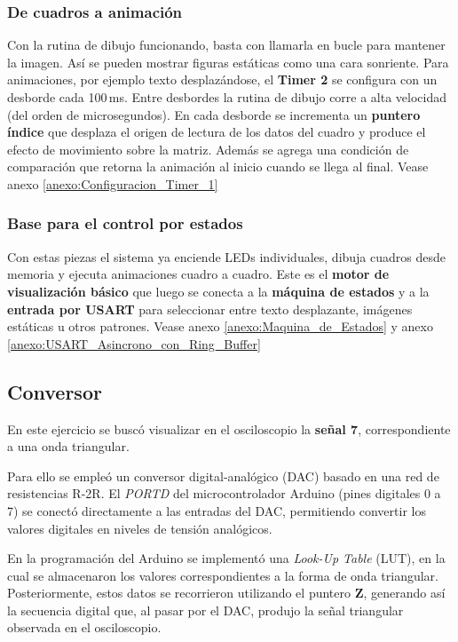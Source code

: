 \subsubsection{De cuadros a animación}
Con la rutina de dibujo funcionando, basta con llamarla en bucle para mantener la imagen. Así se pueden mostrar figuras estáticas como una cara sonriente. Para animaciones, por ejemplo texto desplazándose, el \textbf{Timer 2} se configura con un desborde cada 100\,ms. Entre desbordes la rutina de dibujo corre a alta velocidad (del orden de microsegundos). En cada desborde se incrementa un \textbf{puntero índice} que desplaza el origen de lectura de los datos del cuadro y produce el efecto de movimiento sobre la matriz. Además se agrega una condición de comparación que retorna la animación al inicio cuando se llega al final. Vease anexo \ref{anexo:Configuracion_Timer_1}


\subsubsection{Base para el control por estados}
Con estas piezas el sistema ya enciende LEDs individuales, dibuja cuadros desde memoria y ejecuta animaciones cuadro a cuadro. Este es el \textbf{motor de visualización básico} que luego se conecta a la \textbf{máquina de estados} y a la \textbf{entrada por USART} para seleccionar entre texto desplazante, imágenes estáticas u otros patrones. Vease anexo \ref{anexo:Maquina_de_Estados} y anexo \ref{anexo:USART_Asincrono_con_Ring_Buffer}


\subsection{Conversor}
En este ejercicio se buscó visualizar en el osciloscopio la \textbf{señal 7}, correspondiente a una onda triangular.

Para ello se empleó un conversor digital-analógico (DAC) basado en una red de resistencias R-2R. El \textit{PORTD} del microcontrolador Arduino (pines digitales 0 a 7) se conectó directamente a las entradas del DAC, permitiendo convertir los valores digitales en niveles de tensión analógicos.

En la programación del Arduino se implementó una \textit{Look-Up Table} (LUT), en la cual se almacenaron los valores correspondientes a la forma de onda triangular. Posteriormente, estos datos se recorrieron utilizando el puntero \textbf{Z}, generando así la secuencia digital que, al pasar por el DAC, produjo la señal triangular observada en el osciloscopio.

